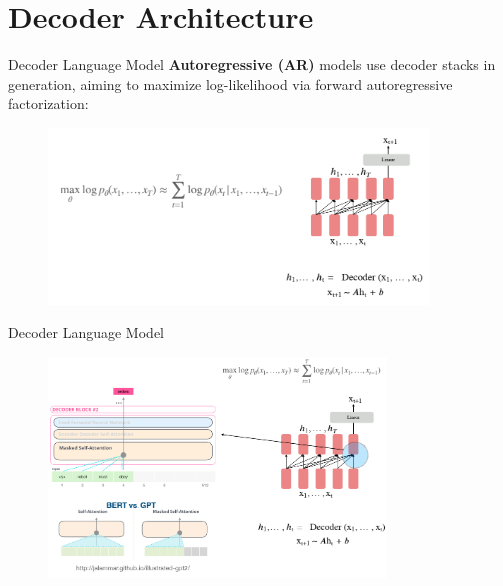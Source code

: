 \documentclass[serif, aspectratio=169]{beamer}
\begin{document}
\section{Decoder Architecture}

\begin{frame}{Decoder Language Model}
    \textbf{Autoregressive (AR)} models use decoder stacks in generation, aiming to
    maximize log-likelihood via forward autoregressive factorization:
    \begin{figure}
        \centering
        \includegraphics[width=0.9\textwidth]{Figures/decoderlm.png}
    \end{figure}
\end{frame}

\begin{frame}{Decoder Language Model}
    \begin{figure}
        \centering
        \includegraphics[width=0.8\textwidth]{Figures/decodelm1.png}
    \end{figure}
\end{frame}
\end{document}
